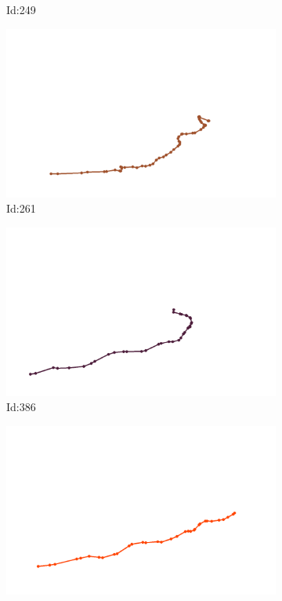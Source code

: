 \documentclass[12pt,twoside]{report}
\begin{document}
\begin{figure}
\begin{subfigure}[b]{0.20\textwidth}
\caption{Id:249}
\end{subfigure}
\begin{subfigure}[b]{0.20\textwidth}
\centering
\includegraphics[width=\textwidth]{../../trajectories/261.png}
\caption{Id:261}
\end{subfigure}
\begin{subfigure}[b]{0.20\textwidth}
\centering
\includegraphics[width=\textwidth]{../../trajectories/386.png}
\caption{Id:386}
\end{subfigure}
\begin{subfigure}[b]{0.20\textwidth}
\centering
\includegraphics[width=\textwidth]{../../trajectories/737.png}

\end{subfigure}
\end{figure}
\end{document}
